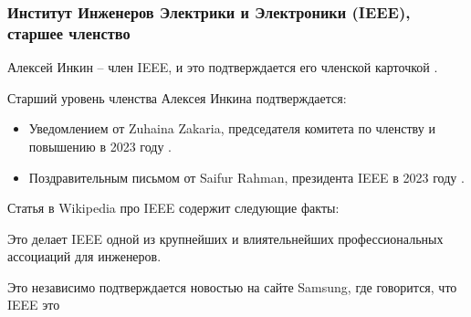 \subsubsection{Институт Инженеров Электрики и Электроники (IEEE), старшее членство}
\label{subsubsec:AssociationsIeee}


Алексей Инкин -- член IEEE, и это подтверждается его членской карточкой .



Старший уровень членства Алексея Инкина подтверждается:

\vspace{-0.5\baselineskip}
\vspace{-0.5\baselineskip}
\begin{itemize}[nosep]

    \item Уведомлением от Zuhaina Zakaria, председателя комитета по членству и повышению в 2023 году
    .

    \item Поздравительным письмом от Saifur Rahman, президента IEEE в 2023 году .

\end{itemize}



Статья в Wikipedia про IEEE содержит следующие факты:




Это делает IEEE одной из крупнейших и влиятельнейших профессиональных ассоциаций для инженеров.

Это независимо подтверждается новостью на сайте Samsung,
где говорится, что IEEE это

